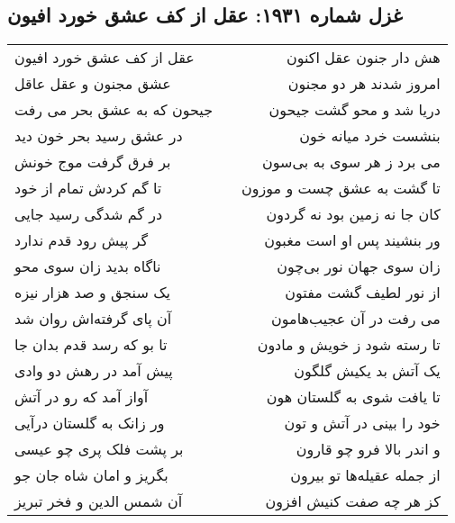 \begin{center}
\section*{غزل شماره ۱۹۳۱: عقل از کف عشق خورد افیون}
\label{sec:1931}
\begin{longtable}{l p{0.5cm} r}
عقل از کف عشق خورد افیون
&&
هش دار جنون عقل اکنون
\\
عشق مجنون و عقل عاقل
&&
امروز شدند هر دو مجنون
\\
جیحون که به عشق بحر می رفت
&&
دریا شد و محو گشت جیحون
\\
در عشق رسید بحر خون دید
&&
بنشست خرد میانه خون
\\
بر فرق گرفت موج خونش
&&
می برد ز هر سوی به بی‌سون
\\
تا گم کردش تمام از خود
&&
تا گشت به عشق چست و موزون
\\
در گم شدگی رسید جایی
&&
کان جا نه زمین بود نه گردون
\\
گر پیش رود قدم ندارد
&&
ور بنشیند پس او است مغبون
\\
ناگاه بدید زان سوی محو
&&
زان سوی جهان نور بی‌چون
\\
یک سنجق و صد هزار نیزه
&&
از نور لطیف گشت مفتون
\\
آن پای گرفته‌اش روان شد
&&
می رفت در آن عجیب‌هامون
\\
تا بو که رسد قدم بدان جا
&&
تا رسته شود ز خویش و مادون
\\
پیش آمد در رهش دو وادی
&&
یک آتش بد یکیش گلگون
\\
آواز آمد که رو در آتش
&&
تا یافت شوی به گلستان هون
\\
ور زانک به گلستان درآیی
&&
خود را بینی در آتش و تون
\\
بر پشت فلک پری چو عیسی
&&
و اندر بالا فرو چو قارون
\\
بگریز و امان شاه جان جو
&&
از جمله عقیله‌ها تو بیرون
\\
آن شمس الدین و فخر تبریز
&&
کز هر چه صفت کنیش افزون
\\
\end{longtable}
\end{center}
